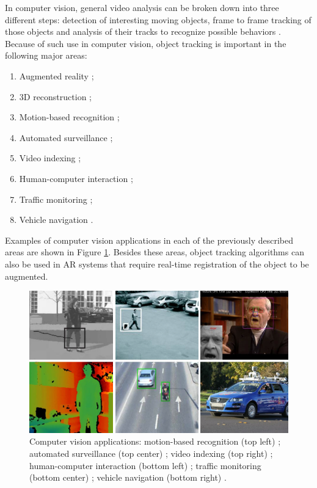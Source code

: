 In computer vision, general video analysis can be broken down into three different steps: detection of interesting moving objects, frame to frame tracking of those objects and analysis of their tracks to recognize possible behaviors \cite{Yilmaz2006}. Because of such use in computer vision, object tracking is important in the following major areas:

\begin{enumerate}
  \item Augmented reality \cite{Azuma1997};
  \item 3D reconstruction \cite{Zhou2008};
  \item Motion-based recognition \cite{Cedras1995};
  \item Automated surveillance \cite{Javed2002};
  \item Video indexing \cite{Javed2002};
  \item Human-computer interaction \cite{Ren2010};
  \item Traffic monitoring \cite{Gloyer1994};
  \item Vehicle navigation \cite{Jia2009}.
\end{enumerate}

Examples of computer vision applications in each of the previously described areas are shown in Figure \ref{figure:cv_applications}. Besides these areas, object tracking algorithms can also be used in AR systems that require real-time registration of the object to be augmented.

\begin{figure}[!htb]
  \centering
  \includegraphics[width=\linewidth]{chapters/basic_concepts/cv_applications.png}
  \caption{Computer vision applications: motion-based recognition (top left) \cite{Cedras1995}; automated surveillance (top center) \cite{Javed2002}; video indexing (top right) \cite{Javed2002}; human-computer interaction (bottom left) \cite{Ren2010}; traffic monitoring (bottom center) \cite{Gloyer1994}; vehicle navigation (bottom right) \cite{Jia2009}.}
  \label{figure:cv_applications}
\end{figure}

